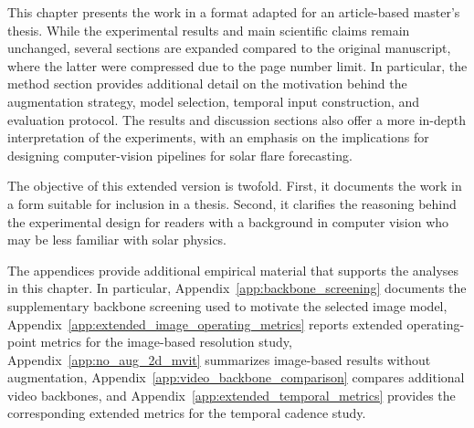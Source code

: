 \setcounter{corA}{0}
\anglais

\articleenchapitre
\providecommand{\best}[1]{\bm{#1}}





\maketitle
\label{chap:article1}

\newpage
This chapter presents the work in a format adapted for an article-based master's thesis. While the experimental results and main scientific claims remain unchanged, several sections are expanded compared to the original manuscript, where the latter were compressed due to the page number limit. In particular, the method section provides additional detail on the motivation behind the augmentation strategy, model selection, temporal input construction, and evaluation protocol. The results and discussion sections also offer a more in-depth interpretation of the experiments, with an emphasis on the implications for designing computer-vision pipelines for solar flare forecasting.

The objective of this extended version is twofold. First, it documents the work in a form suitable for inclusion in a thesis. Second, it clarifies the reasoning behind the experimental design for readers with a background in computer vision who may be less familiar with solar physics.

The appendices provide additional empirical material that supports the analyses in this chapter. In particular, Appendix~\ref{app:backbone_screening} documents the supplementary backbone screening used to motivate the selected image model, Appendix~\ref{app:extended_image_operating_metrics} reports extended operating-point metrics for the image-based resolution study, Appendix~\ref{app:no_aug_2d_mvit} summarizes image-based results without augmentation, Appendix~\ref{app:video_backbone_comparison} compares additional video backbones, and Appendix~\ref{app:extended_temporal_metrics} provides the corresponding extended metrics for the temporal cadence study.

